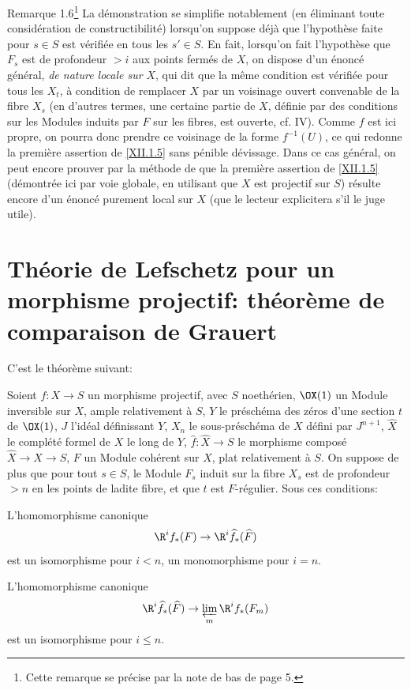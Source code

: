 \label{XII.1.6}
\begin{enonce*}[remark]{Remarque 1.6\footnote{Cette remarque se pr\'ecise par la note de bas de page 5.}}  La d\'emonstration se simplifie notablement (en \'eliminant toute consid\'eration de constructibilit\'e) lorsqu'on suppose d\'ej\`a que l'hypoth\`ese faite pour $s\in S$ est v\'erifi\'ee en tous les $s'\in S$. En fait, lorsqu'on fait l'hypoth\`ese que $F_s$ est de profondeur $>i$ aux points ferm\'es de $X$, on dispose d'un \'enonc\'e g\'en\'eral, \emph{de nature locale sur} $X$, qui dit que la m\^eme condition est v\'erifi\'ee pour tous les $X_t$, \`a condition de remplacer $X$ par un voisinage ouvert convenable de la fibre $X_s$ (en d'autres termes, une certaine partie de $X$, d\'efinie par des conditions sur les Modules induits par $F$ sur les fibres, est ouverte, cf. \EGA IV). Comme $f$ est ici propre, on pourra donc prendre ce voisinage de la forme $f^{-1}(U)$, ce qui redonne la premi\`ere assertion de \ref{XII.1.5} sans p\'enible d\'evissage. Dans ce cas g\'en\'eral, on peut encore prouver par la m\'ethode de \loccit que la premi\`ere assertion de \ref{XII.1.5} (d\'emontr\'ee ici par voie globale, en utilisant que $X$ est projectif sur $S$) r\'esulte encore d'un \'enonc\'e purement local sur $X$ (que le lecteur explicitera s'il le juge utile).
\end{enonce*}

\section[Th\'eorie de Lefschetz pour un morphisme projectif: comparaison]
{Th\'eorie de Lefschetz pour un morphisme projectif: th\'eor\`eme de comparaison de Grauert} \label{XII.2}

\setcounter{equation}{13}
C'est le th\'eor\`eme suivant:

\begin{theoreme} \label{XII.2.1}
Soient $f:X\to S$ un morphisme projectif, avec $S$ noeth\'erien, $\OX(1)$ un Module inversible sur $X$, ample relativement \`a $S$, $Y$ le pr\'esch\'ema des z\'eros d'une section $t$ de $\OX(1)$, $J$ l'id\'eal d\'efinissant $Y$, $X_n$ le sous-pr\'esch\'ema de $X$ d\'efini par $J^{n+1}$, $\widehat{X}$ le compl\'et\'e formel de $X$ le long de $Y$, $\widehat{f}:\widehat{X}\to S$ le morphisme compos\'e $\widehat{X}\to X\to S$, $F$ un Module coh\'erent sur $X$, plat relativement \`a $S$. On suppose de plus que pour tout $s\in S$, le Module $F_s$ induit sur la fibre $X_s$ est de profondeur $>n$ en les points de ladite fibre, et que $t$ est $F$-r\'egulier. Sous ces conditions:
\begin{enumeratei}
\item
L'homomorphisme canonique
\[
\R^if_\ast(F) \to \R^i\widehat{f}_\ast(\widehat{F})
\]
est un isomorphisme pour $i<n$, un monomorphisme pour $i=n$.
\item
L'homomorphisme canonique
\[
\R^i\widehat{f}_\ast(\widehat{F}) \to \varprojlim_m \R^if_\ast(F_m)
\]
est un isomorphisme pour $i\leq n$.
\end{enumeratei}
\end{theoreme}

